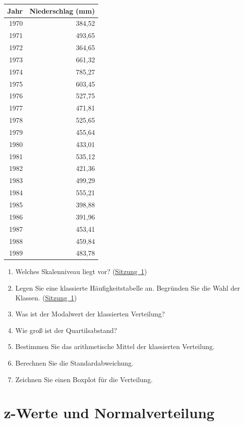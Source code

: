\documentclass[
  11pt,
  ngerman,
  a4paper,
]{report}
\providecommand{\tightlist}{%
  \setlength{\itemsep}{0pt}\setlength{\parskip}{0pt}}
\begin{document}
\begin{table}[H]
\centering
\begin{tabular}{rr}
\toprule
Jahr & Niederschlag (mm)\\
\midrule
1970 & 384,52\\
1971 & 493,65\\
1972 & 364,65\\
1973 & 661,32\\
1974 & 785,27\\
1975 & 603,45\\
1976 & 527,75\\
1977 & 471,81\\
1978 & 525,65\\
1979 & 455,64\\
1980 & 433,01\\
1981 & 535,12\\
1982 & 421,36\\
1983 & 499,29\\
1984 & 555,21\\
1985 & 398,88\\
1986 & 391,96\\
1987 & 453,41\\
1988 & 459,84\\
1989 & 483,78\\
\bottomrule
\end{tabular}
\end{table}

\begin{enumerate}
\def\labelenumi{\alph{enumi})}
\tightlist
\item
  Welches Skalenniveau liegt vor? (\protect\hyperlink{skalenniveaus}{Sitzung~1})
\item
  Legen Sie eine klassierte Häufigkeitstabelle an. Begründen Sie die Wahl der Klassen. (\protect\hyperlink{quantitative-variablen-1}{Sitzung~1})
\item
  Was ist der Modalwert der klassierten Verteilung?
\item
  Wie groß ist der Quartilsabstand?
\item
  Bestimmen Sie das arithmetische Mittel der klassierten Verteilung.
\item
  Berechnen Sie die Standardabweichung.
\item
  Zeichnen Sie einen Boxplot für die Verteilung.
\end{enumerate}

\hypertarget{z-werte-und-normalverteilung}{%
\chapter{z-Werte und Normalverteilung}\label{z-werte-und-normalverteilung}}
\end{document}
